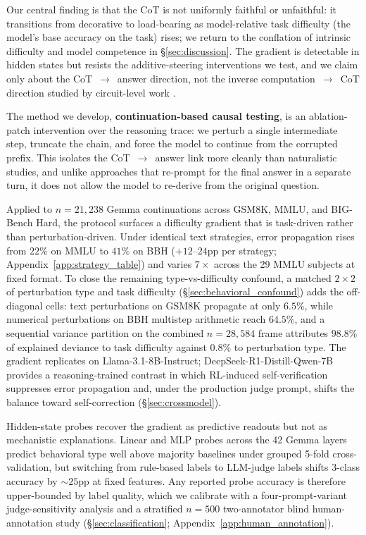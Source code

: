 \documentclass[10pt]{article} %
\begin{document}
Our central finding is that the CoT is not uniformly faithful or unfaithful: it transitions from decorative to load-bearing as model-relative task difficulty (the model's base accuracy on the task) rises; we return to the conflation of intrinsic difficulty and model competence in \S\ref{sec:discussion}. The gradient is detectable in hidden states but resists the additive-steering interventions we test, and we claim only about the CoT~$\to$~answer direction, not the inverse computation~$\to$~CoT direction studied by circuit-level work \citep{lindsey2025, ameisen2025}.

The method we develop, \textbf{continuation-based causal testing}, is an ablation-patch intervention over the reasoning trace: we perturb a single intermediate step, truncate the chain, and force the model to continue from the corrupted prefix. This isolates the CoT~$\to$~answer link more cleanly than naturalistic studies, and unlike approaches that re-prompt for the final answer in a separate turn, it does not allow the model to re-derive from the original question.

Applied to $n = 21{,}238$ Gemma continuations across GSM8K, MMLU, and BIG-Bench Hard, the protocol surfaces a difficulty gradient that is task-driven rather than perturbation-driven. Under identical text strategies, error propagation rises from $22\%$ on MMLU to $41\%$ on BBH ($+12$--$24$pp per strategy; Appendix~\ref{app:strategy_table}) and varies $7\times$ across the 29 MMLU subjects at fixed format. To close the remaining type-vs-difficulty confound, a matched $2{\times}2$ of perturbation type and task difficulty (\S\ref{sec:behavioral_confound}) adds the off-diagonal cells: text perturbations on GSM8K propagate at only $6.5\%$, while numerical perturbations on BBH multistep arithmetic reach $64.5\%$, and a sequential variance partition on the combined $n = 28{,}584$ frame attributes $98.8\%$ of explained deviance to task difficulty against $0.8\%$ to perturbation type. The gradient replicates on Llama-3.1-8B-Instruct; DeepSeek-R1-Distill-Qwen-7B provides a reasoning-trained contrast in which RL-induced self-verification suppresses error propagation and, under the production judge prompt, shifts the balance toward self-correction (\S\ref{sec:crossmodel}).

Hidden-state probes recover the gradient as predictive readouts but not as mechanistic explanations. Linear and MLP probes across the 42 Gemma layers predict behavioral type well above majority baselines under grouped 5-fold cross-validation, but switching from rule-based labels to LLM-judge labels shifts 3-class accuracy by $\sim$$25$pp at fixed features. Any reported probe accuracy is therefore upper-bounded by label quality, which we calibrate with a four-prompt-variant judge-sensitivity analysis and a stratified $n = 500$ two-annotator blind human-annotation study (\S\ref{sec:classification}; Appendix~\ref{app:human_annotation}).
\end{document}
